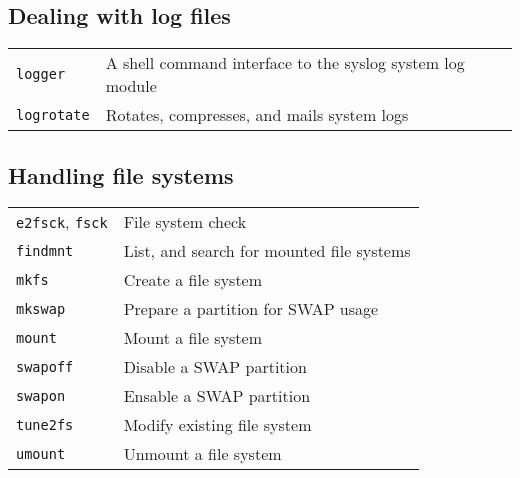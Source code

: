\documentclass[10pt]{article}
\begin{document}
\begin{multicols}{2}
\section{Dealing with log files}
\begin{tabular}{ p{2.5cm} p{8.5cm} }
  \hline
  \texttt{logger} & A shell command interface to the syslog system log module \\
  \rowcolor{Gray}
  \texttt{logrotate} & Rotates, compresses, and mails system logs \\
  \hline
\end{tabular}

\end{multicols}

\newpage

\cheatsheet

\begin{multicols}{2} 
\section{Handling file systems}
\begin{tabular}{ p{2.5cm} p{8.5cm} }
  \hline
  \texttt{e2fsck}, \texttt{fsck} & File system check \\
  \rowcolor{Gray}
  \texttt{findmnt} & List, and search for mounted file systems \\
  \texttt{mkfs} & Create a file system \\
  \rowcolor{Gray}
  \texttt{mkswap} & Prepare a partition for SWAP usage \\
  \texttt{mount} & Mount a file system \\
  \rowcolor{Gray}
  \texttt{swapoff} & Disable a SWAP partition \\
  \texttt{swapon} & Ensable a SWAP partition \\
  \rowcolor{Gray}
  \texttt{tune2fs} & Modify existing file system \\
  \texttt{umount} & Unmount a file system\\
  \hline
\end{tabular}



\end{multicols}
\end{document}
